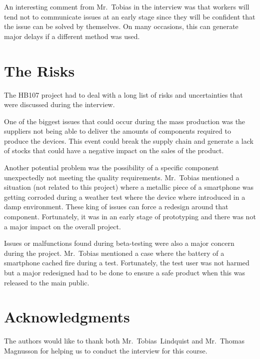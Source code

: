 \documentclass[journal]{IEEEtran}
\begin{document}
An interesting comment from Mr.~Tobias in the interview was that workers will tend not to communicate issues at an early stage since they will be confident that the issue can be solved by themselves. On many occasions, this can generate major delays if a different method was used.

\section{The Risks}
The HB107 project had to deal with a long list of risks and uncertainties that were discussed during the interview.

One of the biggest issues that could occur during the mass production was the suppliers not being able to deliver the amounts of components required to produce the devices. This event could break the supply chain and generate a lack of stocks that could have a negative impact on the sales of the product.

Another potential problem was the possibility of a specific component unexpectedly not meeting the quality requirements. Mr.~Tobias mentioned a situation (not related to this project) where a metallic piece of a smartphone was getting corroded during a weather test where the device where introduced in a damp environment. These king of issues can force a redesign around that component. Fortunately, it was in an early stage of prototyping and there was not a major impact on the overall project.

Issues or malfunctions found during beta-testing were also a major concern during the project. Mr.~Tobias mentioned a case where the battery of a smartphone cached fire during a test. Fortunately, the test user was not harmed but a major redesigned had to be done to ensure a safe product when this was released to the main public.

\section*{Acknowledgments}
The authors would like to thank both  Mr.~Tobias~Lindquist and Mr.~Thomas Magnusson for helping us to conduct the interview for this course.
\end{document}
